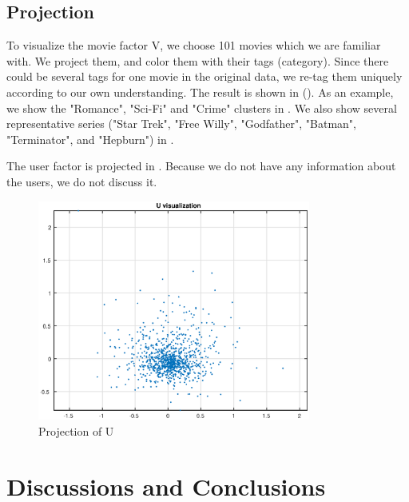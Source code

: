 \documentclass[12pt]{article}
\begin{document}
\subsection{Projection}
To visualize the movie factor V, we choose 101 movies which we are familiar with. We project them, and color them with their tags (category). Since there could be several tags for one movie in the original data, we re-tag them uniquely according to our own understanding. The result is shown in (). As an example, we show the "Romance", "Sci-Fi" and "Crime" clusters in . We also show several representative series ("Star Trek", "Free Willy", "Godfather", "Batman", "Terminator", and "Hepburn") in .

The user factor is projected in . Because we do not have any information about the users, we do not discuss it.

\begin{figure}[h!]
  \centering
      \includegraphics[width=0.8\textwidth]{U}
  \caption{Projection of U}
  \label{fig:U}
\end{figure}

\section{Discussions and Conclusions}
\end{document}
